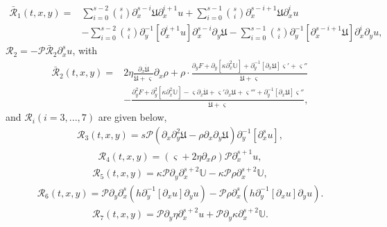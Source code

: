 \documentclass{amsart}
\numberwithin{equation}{section}
\begin{document}
\begin{align*}
\bar{\mathcal{R}}_{1}(t,x,y)
=& \sum_{i=0}^{s-2}\binom{s}{i}\partial_{x}^{s-i}\mathfrak{U}\partial_{x}^{i+1}u
  +\sum_{i=0}^{s-1}\binom{s}{i}\partial_{x}^{s-i+1}\mathfrak{U}\partial_{x}^{i}u\\
 &-\sum_{i=0}^{s-2}\binom{s}{i}\partial_{y}^{-1}[\partial_{x}^{i+1}u]\partial_{x}^{s-i}\partial_{y}\mathfrak{U}
  -\sum_{i=0}^{s-1}\binom{s}{i}\partial_{y}^{-1}[\partial_{x}^{s-i+1}\mathfrak{U}]\partial_{x}^{i}\partial_{y}u,
\end{align*}
$\mathcal{R}_{2}=-\mathcal{P}\bar{\mathcal{R}}_{2}\partial_{x}^{s}u$, with
\begin{align*}
\bar{\mathcal{R}}_{2}(t,x,y)
=& 2\eta\frac{\partial_{x}\dot{\mathfrak{U}}}{\dot{\mathfrak{U}}+\varsigma}\partial_{x}\rho
  +\rho\cdot\frac{\partial_{y}F+\partial_{y}[\kappa\partial_{x}^{2}\mathbb{U}]+\partial_{y}^{-1}[\partial_{x}\mathfrak{U}]\varsigma'+\varsigma''}{\dot{\mathfrak{U}}+\varsigma}\\
 &-\frac{\partial_{y}^{2}F+\partial_{y}^{2}[\kappa\partial_{x}^{2}\mathbb{U}]-\varsigma\partial_{x}\dot{\mathfrak{U}}+\varsigma'\partial_{x}\mathfrak{U}+\varsigma'''+\partial_{y}^{-1}[\partial_{x}\mathfrak{U}]\varsigma''}{\dot{\mathfrak{U}}+\varsigma},
\end{align*}
and $\mathcal{R}_{i}(i=3,...,7)$ are given below,
\begin{align*}
\mathcal{R}_{3}(t,x,y)
=s\mathcal{P}\left(\partial_{x}\partial_{y}^{2}\mathfrak{U}-\rho\partial_{x}\partial_{y}\mathfrak{U}\right)\partial_{y}^{-1}[\partial_{x}^{s}u],
\end{align*}
\begin{align*}
\mathcal{R}_{4}(t,x,y)
=(\varsigma+2\eta\partial_{x}\rho)\mathcal{P}\partial_{x}^{s+1}u,
\end{align*}
\begin{align*}
\mathcal{R}_{5}(t,x,y)
=\kappa\mathcal{P}\partial_{y}\partial_{x}^{s+2}\mathbb{U}
 -\kappa\mathcal{P}\rho\partial_{x}^{s+2}\mathbb{U},
\end{align*}
\begin{align*}
\mathcal{R}_{6}(t,x,y)
= \mathcal{P}\partial_{y}\partial_{x}^{s}(h\partial_{y}^{-1}[\partial_{x}u]\partial_{y}u)
 -\mathcal{P}\rho\partial_{x}^{s}(h\partial_{y}^{-1}[\partial_{x}u]\partial_{y}u).
\end{align*}
\begin{align*}
\mathcal{R}_{7}(t,x,y)
= \mathcal{P}\partial_{y}\eta\partial_{x}^{s+2}u
 +\mathcal{P}\partial_{y}\kappa\partial_{x}^{s+2}\mathbb{U}.
\end{align*}
\end{document}
